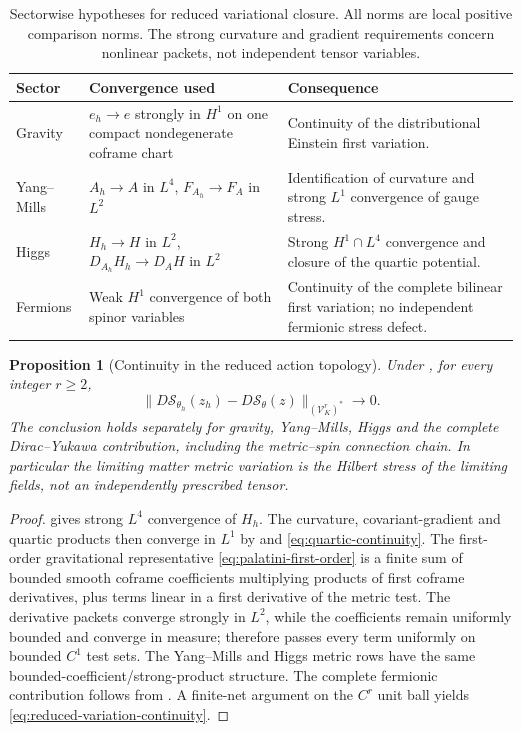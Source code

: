 \documentclass[11pt]{article}
\numberwithin{equation}{section}
\newtheorem{proposition}[proposition]{Proposition}
\theoremstyle{definition}
\theoremstyle{remark}
\newcommand{\norm}[1]{\lVert#1\rVert}
\newcommand{\Sact}{\mathscr S}
\newcommand{\Vtest}{\mathscr V}
\begin{document}
\begin{table}[htbp]
\centering\small
\caption{Sectorwise hypotheses for reduced variational closure.  All norms
are local positive comparison norms.  The strong curvature and gradient
requirements concern nonlinear packets, not independent tensor variables.}
\label{tab:action-topology}
\begin{tabularx}{\textwidth}{@{}l>{\raggedright\arraybackslash}X>{\raggedright\arraybackslash}X@{}}
\toprule
Sector & Convergence used & Consequence\\
\midrule
Gravity & $e_h\to e$ strongly in $H^1$ on one compact nondegenerate coframe chart &
Continuity of the distributional Einstein first variation.\\[3pt]
Yang--Mills & $A_h\to A$ in $L^4$, $F_{A_h}\to F_A$ in $L^2$ &
Identification of curvature and strong $L^1$ convergence of gauge stress.\\[3pt]
Higgs & $H_h\to H$ in $L^2$, $D_{A_h}H_h\to D_AH$ in $L^2$ &
Strong $H^1\cap L^4$ convergence and closure of the quartic potential.\\[3pt]
Fermions & Weak $H^1$ convergence of both spinor variables &
Continuity of the complete bilinear first variation; no independent fermionic stress defect.\\
\bottomrule
\end{tabularx}
\end{table}

\begin{proposition}[Continuity in the reduced action topology]
\label{prop:reduced-continuity}
Under , for every integer $r\ge2$,
\begin{equation}
 \norm{D\Sact_{\theta_h}(z_h)-D\Sact_\theta(z)}_{(\Vtest_K^r)^*}\longrightarrow0.
 \label{eq:reduced-variation-continuity}
\end{equation}
The conclusion holds separately for gravity, Yang--Mills, Higgs and the
complete Dirac--Yukawa contribution, including the metric--spin connection
chain.  In particular the limiting matter metric variation is the Hilbert
stress of the limiting fields, not an independently prescribed tensor.
\end{proposition}
\begin{proof}
 gives strong $L^4$ convergence of
$H_h$.  The curvature, covariant-gradient and quartic products then converge
in $L^1$ by  and \eqref{eq:quartic-continuity}.
The first-order gravitational representative
\eqref{eq:palatini-first-order} is a finite sum of bounded smooth coframe
coefficients multiplying products of first coframe derivatives, plus terms
linear in a first derivative of the metric test.  The derivative packets
converge strongly in $L^2$, while the coefficients remain uniformly bounded
and converge in measure;  therefore passes every term
uniformly on bounded $C^1$ test sets.  The Yang--Mills and Higgs metric rows
have the same bounded-coefficient/strong-product structure.  The complete
fermionic contribution follows from .  A finite-net
argument on the $C^r$ unit ball yields
\eqref{eq:reduced-variation-continuity}.
\end{proof}
\end{document}

